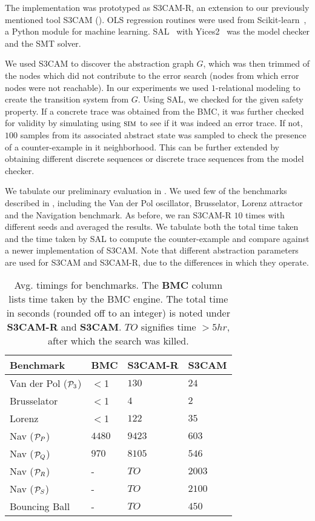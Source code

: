
The implementation was prototyped as S3CAM-R, an extension to our
previously mentioned tool S3CAM (). OLS regression
routines were used from Scikit-learn~\cite{pedregosa2011scikit}, a
Python module for machine learning. SAL~\cite{SAL-SRI}
with Yices2~\cite{dutertre2014yices} was the model checker and the SMT
solver.

We used S3CAM to discover the abstraction graph $G$, which was then
trimmed of the nodes which did not contribute to the error search
(nodes from which error nodes were not reachable). In our experiments we
used $1$-relational modeling to create the transition system from $G$.
Using SAL, we checked for the given safety property. If a concrete
trace was obtained from the BMC, it was further checked for validity
by simulating using $\mbox{\sc sim}$ to see if it was indeed an error
trace.  If not, $100$ samples from its associated abstract state was
sampled to check the presence of a counter-example in it
neighborhood. This can be further extended by obtaining different
discrete sequences or discrete trace sequences from the model checker.

We tabulate our preliminary evaluation in . We used
few of the benchmarks described in , including the Van
der Pol oscillator, Brusselator, Lorenz attractor and the Navigation
benchmark. As before, we ran S3CAM-R $10$ times with different seeds
and averaged the results. We tabulate both the total time taken and
the time taken by SAL to compute the counter-example and compare
against a newer implementation of S3CAM. Note that different
abstraction parameters are used for S3CAM and S3CAM-R, due to the
differences in which they operate.

\begin{table*}[!htbp]
\centering
\caption{Avg. timings for benchmarks. The \textbf{BMC} column lists
time taken by the BMC engine. The total time in seconds (rounded off
to an integer) is noted under \textbf{S3CAM-R} and \textbf{S3CAM}.
$TO$ signifies time $>5hr$, after which the search was killed.}
\label{tab:res-rel}
\begin{tabular}{@{}llll@{}}
\toprule
Benchmark & BMC & S3CAM-R & S3CAM\\
\midrule
Van der Pol ($\mathcal{P}_3$)   &$<$1 & $130$ & $24$\\
Brusselator               &$<$1  & $4$    & $2$\\
Lorenz                    &$<$1 & $122$  & $35$\\
Nav ($\mathcal{P}_P$)           &$4480$ &$9423$   &$603$ \\
Nav ($\mathcal{P}_Q$)           &$970$  &$8105$   &$546$ \\
Nav ($\mathcal{P}_R$)           &-  &$TO$   & $2003$\\
Nav ($\mathcal{P}_S$)           &-  &$TO$   & $2100$\\
Bouncing Ball             &-  &$TO$   & $450$\\

\bottomrule
\end{tabular}
\end{table*}

